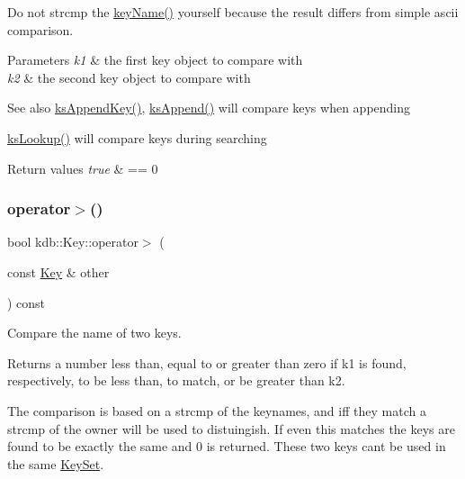 Do not strcmp the \hyperlink{group__keyname_ga8e805c726a60da921d3736cda7813513}{key\+Name()} yourself because the result differs from simple ascii comparison.


\begin{DoxyParams}{Parameters}
{\em k1} & the first key object to compare with \\
\hline
{\em k2} & the second key object to compare with\\
\hline
\end{DoxyParams}
\begin{DoxySeeAlso}{See also}
\hyperlink{group__keyset_gaa5a1d467a4d71041edce68ea7748ce45}{ks\+Append\+Key()}, \hyperlink{group__keyset_ga21eb9c3a14a604ee3a8bdc779232e7b7}{ks\+Append()} will compare keys when appending 

\hyperlink{group__keyset_gaa34fc43a081e6b01e4120daa6c112004}{ks\+Lookup()} will compare keys during searching
\end{DoxySeeAlso}

\begin{DoxyRetVals}{Return values}
{\em true} & == 0 \\
\hline
\end{DoxyRetVals}
\mbox{\label{classkdb_1_1Key_af616a48861b70b93e6f5955206c9257e}} 
\subsubsection{\texorpdfstring{operator$>$()}{operator>()}}
{\footnotesize\ttfamily bool kdb\+::\+Key\+::operator$>$ (\begin{DoxyParamCaption}\item[{const \hyperlink{classkdb_1_1Key}{Key} \&}]{other }\end{DoxyParamCaption}) const\hspace{0.3cm}{\ttfamily [inline]}}



Compare the name of two keys. 

\begin{DoxyReturn}{Returns}
a number less than, equal to or greater than zero if k1 is found, respectively, to be less than, to match, or be greater than k2.
\end{DoxyReturn}
The comparison is based on a strcmp of the keynames, and iff they match a strcmp of the owner will be used to distuingish. If even this matches the keys are found to be exactly the same and 0 is returned. These two keys can\textquotesingle{}t be used in the same \hyperlink{classkdb_1_1KeySet}{Key\+Set}.

